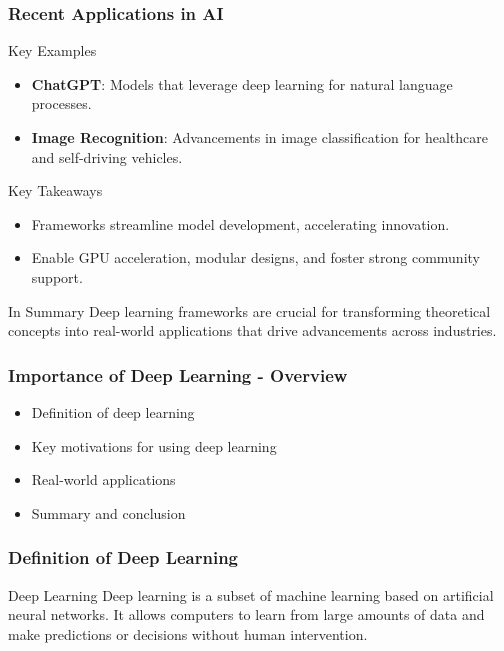 \documentclass[aspectratio=169]{beamer}
\begin{document}
\begin{frame}[fragile]
    \frametitle{Recent Applications in AI}
    \begin{block}{Key Examples}
        \begin{itemize}
            \item \textbf{ChatGPT}: Models that leverage deep learning for natural language processes.
            \item \textbf{Image Recognition}: Advancements in image classification for healthcare and self-driving vehicles.
        \end{itemize}
    \end{block}
    
    \begin{block}{Key Takeaways}
        \begin{itemize}
            \item Frameworks streamline model development, accelerating innovation.
            \item Enable GPU acceleration, modular designs, and foster strong community support.
        \end{itemize}
    \end{block}

    \begin{block}{In Summary}
        Deep learning frameworks are crucial for transforming theoretical concepts into real-world applications that drive advancements across industries.
    \end{block}
\end{frame}

\begin{frame}[fragile]
    \frametitle{Importance of Deep Learning - Overview}
    \begin{itemize}
        \item Definition of deep learning
        \item Key motivations for using deep learning
        \item Real-world applications
        \item Summary and conclusion
    \end{itemize}
\end{frame}

\begin{frame}[fragile]
    \frametitle{Definition of Deep Learning}
    \begin{block}{Deep Learning}
        Deep learning is a subset of machine learning based on artificial neural networks. 
        It allows computers to learn from large amounts of data and make predictions or decisions without human intervention.
    \end{block}
\end{frame}
\end{document}
